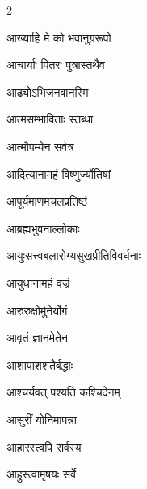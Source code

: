 \begin{multicols}{2}
\begin{indexlist}
\item आख्याहि मे को भवानुग्ररूपो \dotfill {}
\item आचार्याः पितरः पुत्रास्तथैव \dotfill {}
\item आढ्योऽभिजनवानस्मि \dotfill {}
\item आत्मसम्भाविताः स्तब्धा \dotfill {}
\item आत्मौपम्येन सर्वत्र \dotfill {}
\item आदित्यानामहं विष्णुर्ज्योतिषां \dotfill {}
\item आपूर्यमाणमचलप्रतिष्ठं \dotfill {}
\item आब्रह्मभुवनाल्लोकाः \dotfill {}
\item आयुःसत्त्वबलारोग्यसुखप्रीतिविवर्धनाः \dotfill {}
\item आयुधानामहं वज्रं \dotfill {}
\item आरुरुक्षोर्मुनेर्योगं \dotfill {}
\item आवृतं ज्ञानमेतेन \dotfill {}
\item आशापाशशतैर्बद्धाः \dotfill {}
\item आश्चर्यवत् पश्यति कश्चिदेनम् \dotfill {}
\item आसुरीं योनिमापन्ना \dotfill {}
\item आहारस्त्वपि सर्वस्य \dotfill {}
\item आहुस्त्वामृषयः सर्वे \dotfill {}
\end{indexlist}


\end{multicols}
